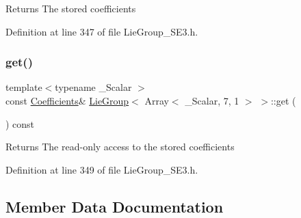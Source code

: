 \begin{DoxyReturn}{Returns}
The stored coefficients 
\end{DoxyReturn}


Definition at line 347 of file Lie\+Group\+\_\+\+S\+E3.\+h.

\hypertarget{class_lie_group_3_01_array_3_01___scalar_00_017_00_011_01_4_01_4_a55244313e03e1da27920e4d7a17c2cd3}{}\label{class_lie_group_3_01_array_3_01___scalar_00_017_00_011_01_4_01_4_a55244313e03e1da27920e4d7a17c2cd3} 
\subsubsection{\texorpdfstring{get()}{get()}\hspace{0.1cm}{\footnotesize\ttfamily [2/2]}}
{\footnotesize\ttfamily template$<$typename \+\_\+\+Scalar $>$ \\
const \hyperlink{class_lie_group_3_01_array_3_01___scalar_00_017_00_011_01_4_01_4_aa5d0fac468a8bdbb468bf2218b93ee0e}{Coefficients}\& \hyperlink{class_lie_group}{Lie\+Group}$<$ Array$<$ \+\_\+\+Scalar, 7, 1 $>$ $>$\+::get (\begin{DoxyParamCaption}{ }\end{DoxyParamCaption}) const\hspace{0.3cm}{\ttfamily [inline]}}

\begin{DoxyReturn}{Returns}
The read-\/only access to the stored coefficients 
\end{DoxyReturn}


Definition at line 349 of file Lie\+Group\+\_\+\+S\+E3.\+h.



\subsection{Member Data Documentation}
\hypertarget{class_lie_group_3_01_array_3_01___scalar_00_017_00_011_01_4_01_4_addbc1e13772e419af9c3cbea4d31bfdf}{}\label{class_lie_group_3_01_array_3_01___scalar_00_017_00_011_01_4_01_4_addbc1e13772e419af9c3cbea4d31bfdf} 
